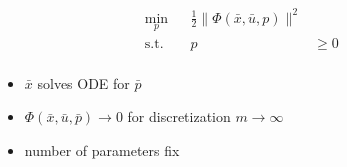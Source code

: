 \begin{frame}
    \begin{align*}
        \min_{p}  & & \frac{1}{2} \| \Phi(\bar{x},\bar{u},p) \|^2 & & \\
        \operatorname{s.t.} & & p & \geq 0 & & \\
    \end{align*}
    \begin{itemize}
        \item{$\bar{x}$ solves ODE for $\bar{p}$}
        \item{$\Phi(\bar{x},\bar{u},\bar{p}) \rightarrow 0$ for discretization $m \rightarrow \infty$}
        \item{number of parameters fix}
    \end{itemize}
\end{frame}

